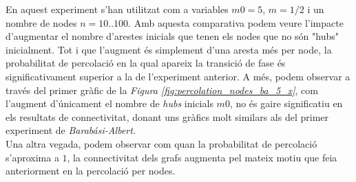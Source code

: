 \documentclass[a4paper]{article}
\begin{document}
	En aquest experiment s'han utilitzat com a variables $m0 = 5$, $m = 1/2$ i un nombre de nodes $n = 10..100$. Amb aquesta comparativa podem veure l'impacte d'augmentar el nombre d'arestes inicials que tenen els nodes que no són "hubs" inicialment. Tot i que l'augment és simplement d'una aresta més per node, la probabilitat de percolació en la qual apareix la transició de fase és significativament superior a la de l'experiment anterior. A més, podem observar a través del primer gràfic de la \textit{Figura \ref{fig:percolation_nodes_ba_5_x}}, com l'augment d'únicament el nombre de \textit{hubs} inicials $m0$, no és gaire significatiu en els resultats de connectivitat, donant uns gràfics molt similars als del primer experiment de \textit{Barabási-Albert}. \\

	Una altra vegada, podem observar com quan la probabilitat de percolació s'aproxima a $1$, la connectivitat dels grafs augmenta pel mateix motiu que feia anteriorment en la percolació per nodes.
\end{document}
